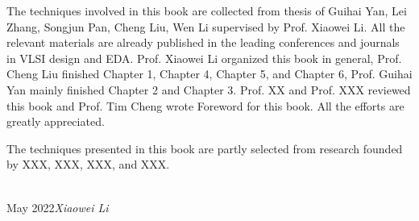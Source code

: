 The techniques involved in this book are collected from thesis of Guihai Yan, Lei Zhang, Songjun Pan, Cheng Liu, Wen Li supervised by Prof. Xiaowei Li. All the relevant materials are already published in the leading conferences and journals in VLSI design and EDA. Prof. Xiaowei Li organized this book in general, Prof. Cheng Liu finished Chapter 1, Chapter 4, Chapter 5, and Chapter 6, Prof. Guihai Yan mainly finished Chapter 2 and Chapter 3. Prof. XX and Prof. XXX reviewed this book and Prof. Tim Cheng wrote Foreword for this book. All the efforts are greatly appreciated.

The techniques presented in this book are partly selected from research founded by XXX, XXX, XXX, and XXX. 

\vspace{\baselineskip}
\begin{flushright}\noindent
{} \\
May 2022\hfill {\it Xiaowei Li}\\
\end{flushright}


